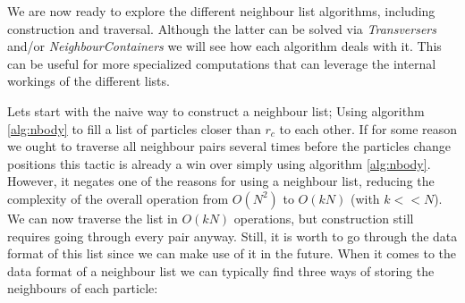 \documentclass[ twoside,openright,titlepage,numbers=noenddot,%
headinclude,footinclude,cleardoublepage=empty,abstract=on,
BCOR=5mm,paper=a4,fontsize=11pt, dvipsnames
]{scrreprt}
\begin{document}
We are now ready to explore the different neighbour list algorithms, including construction and traversal. Although the latter can be solved via \emph{Transversers} and/or \emph{NeighbourContainers} we will see how each algorithm deals with it. This can be useful for more specialized computations that can leverage the internal workings of the different lists.

Lets start with the naive way to construct a neighbour list; Using algorithm \ref{alg:nbody} to fill a list of particles closer than $r_{c}$ to each other. 
If for some reason we ought to traverse all neighbour pairs several times before the particles change positions this tactic is already a win over simply using algorithm \ref{alg:nbody}. However, it negates one of the reasons for using a neighbour list, reducing the complexity of the overall operation from $O(N^2)$ to $O(kN)$ (with $k<<N$). We can now traverse the list in $O(kN)$ operations, but construction still requires going through every pair anyway.
Still, it is worth to go through the data format of this list since we can make use of it in the future. When it comes to the data format of a neighbour list we can typically find three ways of storing the neighbours of each particle:
\end{document}
